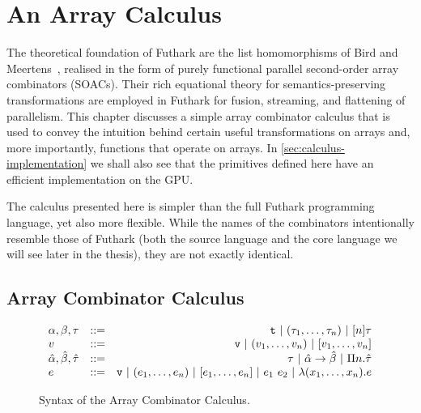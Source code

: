 \newcommand{\czip}{\mathrm{czip}}
\newcommand{\cunzip}{\mathrm{cunzip}}
\newcommand{\cmap}{\mathrm{map}}
\newcommand{\creduce}{\mathrm{reduce}}
\newcommand{\cscan}{\mathrm{scan}}
\newcommand{\cfilter}{\mathrm{scan}}
\newcommand{\inj}{\mathrm{inj}}
\newcommand{\rep}{\mathrm{rep}}
\newcommand{\csFold}{\mathrm{sFold}}
\newcommand{\credomap}{\mathrm{redomap}}
\newcommand{\seg}[1]{\mathbf{#1}}
\newcommand{\tto}{\,\Rightarrow\,}
\newcommand{\iso}{\,\Leftrightarrow\,}
\newcommand{\nat}{\mathbf{N}}
\newcommand{\concat}{\#}
\newcommand{\idd}{\mathrm{id}}
\newcommand{\Id}{\mathrm{id}}
\newcommand{\cfoldl}{\mathrm{foldl}}

\chapter{An Array Calculus}
\label{chap:calculus}

The theoretical foundation of Futhark are the list homomorphisms of
Bird and Meertens~\cite{Bird2}, realised in the form of purely
functional parallel second-order array combinators (SOACs). Their rich
equational theory for semantics-preserving transformations are
employed in Futhark for fusion, streaming, and flattening of
parallelism.  This chapter discusses a simple array combinator
calculus that is used to convey the intuition behind certain useful
transformations on arrays and, more importantly, functions that
operate on arrays.  In \cref{sec:calculus-implementation} we shall
also see that the primitives defined here have an efficient
implementation on the GPU.

The calculus presented here is simpler than the full Futhark
programming language, yet also more flexible.  While the names of the
combinators intentionally resemble those of Futhark (both the source
language and the core language we will see later in the thesis), they
are not exactly identical.

\section{Array Combinator Calculus}
\label{sec:arraycombinators}

\begin{figure}
  \centering
$$
\begin{array}{lrr}
  \alpha,\beta,\tau & ::= & \mbox{\texttt{t}}\ |\ (\tau_1, \ldots, \tau_n)\ |\ [n]\tau \\

  v & ::= & \mbox{\texttt{v}}\ |\ (v_{1}, \ldots, v_{n})\ |\ [v_{1}, \ldots, v_{n}] \\

  \hat{\alpha},\hat{\beta},\hat{\tau} &::=& \tau\ |\ \hat{\alpha}\rightarrow\hat{\beta}\ |\ \Pi n.\hat{\tau} \\

  e &::=& \mbox{\texttt{v}}\ |\ (e_{1}, \ldots, e_{n})\ |\ [e_{1}, \ldots, e_{n}]\ |\ e_1~e_2\ |\ \lambda (x_1,\ldots,x_n).e
\end{array}
$$
  \caption{Syntax of the Array Combinator Calculus.}
  \label{fig:arraycalculus_syntax}
\end{figure}

